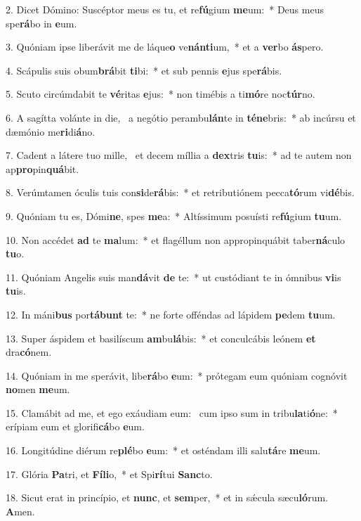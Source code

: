 2. Dicet Dómino: Suscéptor meus es tu, et re\textbf{fú}gium \textbf{me}um:~*  Deus meus spe\textbf{rá}bo in \textbf{e}um.\

3. Quóniam ipse liberávit me de láque\textbf{o} ve\textbf{nán}\textbf{ti}um,~*  et a \textbf{ver}bo \textbf{ás}pero.\

4. Scápulis suis obum\textbf{brá}bit \textbf{ti}bi:~*  et sub pennis \textbf{e}jus spe\textbf{rá}bis.\

5. Scuto circúmdabit te \textbf{vé}ritas \textbf{e}jus:~*  non timébis a ti\textbf{mó}re noc\textbf{túr}no.\

6. A sagítta volánte in die, \dag\  a negótio perambu\textbf{lán}te in \textbf{té}\textbf{ne}bris:~*  ab incúrsu et dæmónio me\textbf{ri}di\textbf{á}no.\

7. Cadent a látere tuo mille, \dag\  et decem míllia a \textbf{dex}tris \textbf{tu}is:~*  ad te autem non ap\textbf{pro}pin\textbf{quá}bit.\

8. Verúmtamen óculis tuis con\textbf{si}de\textbf{rá}bis:~*  et retributiónem pecca\textbf{tó}rum vi\textbf{dé}bis.\

9. Quóniam tu es, Dómi\textbf{ne}, spes \textbf{me}a:~*  Altíssimum posuísti re\textbf{fú}gium \textbf{tu}um.\

10. Non accédet \textbf{ad} te \textbf{ma}lum:~*  et flagéllum non appropinquábit taber\textbf{ná}culo \textbf{tu}o.\

11. Quóniam Angelis suis man\textbf{dá}vit \textbf{de} te:~*  ut custódiant te in ómnibus \textbf{vi}is \textbf{tu}is.\

12. In máni\textbf{bus} por\textbf{tá}\textbf{bunt} te:~*  ne forte offéndas ad lápidem \textbf{pe}dem \textbf{tu}um.\

13. Super áspidem et basilíscum \textbf{am}bu\textbf{lá}bis:~*  et conculcábis leónem \textbf{et} dra\textbf{có}nem.\

14. Quóniam in me sperávit, libe\textbf{rá}bo \textbf{e}um:~*  prótegam eum quóniam cognóvit \textbf{no}men \textbf{me}um.\

15. Clamábit ad me, et ego exáudiam eum: \dag\  cum ipso sum in tribu\textbf{la}ti\textbf{ó}ne:~*  erípiam eum et glorifi\textbf{cá}bo \textbf{e}um.\

16. Longitúdine diérum re\textbf{plé}bo \textbf{e}um:~*  et osténdam illi salu\textbf{tá}re \textbf{me}um.\

17. Glória \textbf{Pa}tri, et \textbf{Fí}\textbf{li}o,~*  et Spi\textbf{rí}tui \textbf{Sanc}to.\

18. Sicut erat in princípio, et \textbf{nunc}, et \textbf{sem}per,~*  et in sǽcula sæcu\textbf{ló}rum. \textbf{A}men.\

